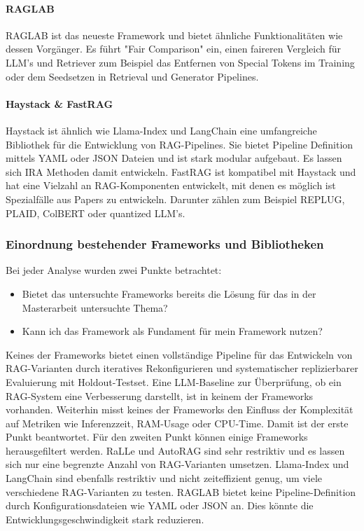 \documentclass[letterpaper, 10 pt, conference]{ieeeconf}
\begin{document}
\paragraph{RAGLAB\cite{zhang-etal-2024-raglab}}
RAGLAB ist das neueste Framework und bietet ähnliche Funktionalitäten wie dessen Vorgänger. Es führt "Fair Comparison" ein, einen faireren Vergleich für LLM's und Retriever zum Beispiel das Entfernen von Special Tokens im Training oder dem Seedsetzen in Retrieval und Generator Pipelines.


\paragraph{Haystack\cite{Pietsch_Haystack_the_end-to-end_2019} \& FastRAG\cite{Izsak_fastRAG_Efficient_Retrieval_2023}}
Haystack ist ähnlich wie Llama-Index und LangChain eine umfangreiche Bibliothek für die Entwicklung von RAG-Pipelines. Sie bietet Pipeline Definition mittels YAML oder JSON Dateien und ist stark modular aufgebaut. Es lassen sich IRA Methoden damit entwickeln. 
FastRAG ist kompatibel mit Haystack und hat eine Vielzahl an RAG-Komponenten entwickelt, mit denen es möglich ist Spezialfälle aus Papers zu entwickeln. 
Darunter zählen zum Beispiel REPLUG\cite{shi2023replugretrievalaugmentedblackboxlanguage}, PLAID\cite{santhanam2022plaidefficientenginelate}, ColBERT\cite{santhanam2022colbertv2effectiveefficientretrieval} oder quantized LLM's.\\

\subsubsection{Einordnung bestehender Frameworks und Bibliotheken}

Bei jeder Analyse wurden zwei Punkte betrachtet:\\
\begin{itemize}
   \item Bietet das untersuchte Frameworks bereits die Lösung für das in der Masterarbeit untersuchte Thema?
   \item Kann ich das Framework als Fundament für mein Framework nutzen?\\
\end{itemize}

Keines der Frameworks bietet einen vollständige Pipeline für das Entwickeln von RAG-Varianten durch iteratives Rekonfigurieren und systematischer replizierbarer Evaluierung mit Holdout-Testset. 
Eine LLM-Baseline zur Überprüfung, ob ein RAG-System eine Verbesserung darstellt, ist in keinem der Frameworks vorhanden.
Weiterhin misst keines der Frameworks den Einfluss der Komplexität auf Metriken wie Inferenzzeit, RAM-Usage oder CPU-Time. 
Damit ist der erste Punkt beantwortet. Für den zweiten Punkt können einige Frameworks herausgefiltert werden.
RaLLe und AutoRAG sind sehr restriktiv und es lassen sich nur eine begrenzte Anzahl von RAG-Varianten umsetzen. Llama-Index und LangChain sind ebenfalls restriktiv und nicht zeiteffizient genug, um viele verschiedene RAG-Varianten zu testen.
RAGLAB bietet keine Pipeline-Definition durch Konfigurationsdateien wie YAML oder JSON an. Dies könnte die Entwicklungsgeschwindigkeit stark reduzieren.
\end{document}
